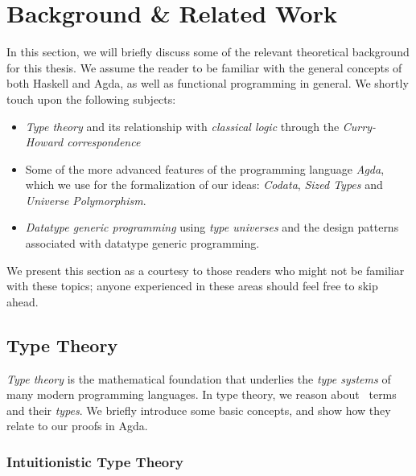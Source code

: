 \documentclass[a4paper,msc,twosized=semi]{uustthesis}
\begin{document}

\chapter{Background \& Related Work}
In this section, we will briefly discuss some of the relevant theoretical background 
for this thesis. We assume the reader to be familiar with the general concepts of both 
Haskell and Agda, as well as functional programming in general. We shortly touch upon 
the following subjects:

\begin{itemize}
  \item
  \emph{Type theory} and its relationship with \emph{classical logic} through the 
  \emph{Curry-Howard correspondence}

  \item 
  Some of the more advanced features of the programming language \emph{Agda}, which we 
  use for the formalization of our ideas: \emph{Codata}, \emph{Sized Types} and \emph
  {Universe Polymorphism}. 

  \item 
  \emph{Datatype generic programming} using \emph{type universes} and the design 
  patterns associated with datatype generic programming.  
\end{itemize}

  We present this section as a courtesy to those readers who might not be familiar 
  with these topics; anyone experienced in these areas should feel free to skip ahead. 

\section{Type Theory}

  \emph{Type theory} is the mathematical foundation that underlies the \emph{type 
  systems} of many modern programming languages. In type theory, we reason about \emph\
  {terms} and their \emph{types}. We briefly introduce some basic concepts, and show 
  how they relate to our proofs in Agda. 

  \subsection{Intuitionistic Type Theory}
\end{document}
